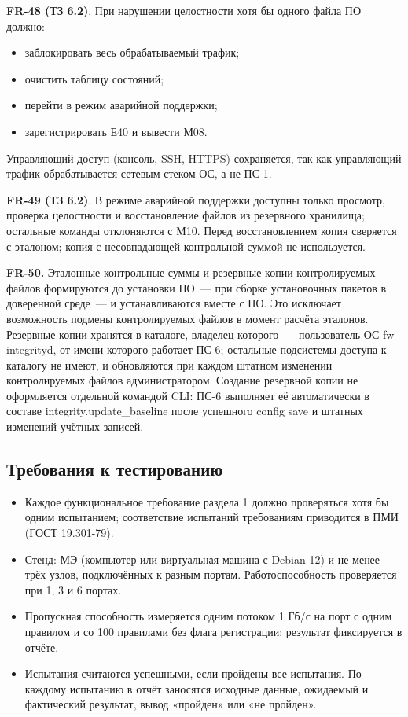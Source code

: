 \documentclass[13pt,a4paper,final]{article}
\begin{document}
	\textbf{FR-48 (ТЗ 6.2)}. При нарушении целостности хотя бы одного файла ПО должно:
	\begin{itemize}
		\item заблокировать весь обрабатываемый трафик;
		\item очистить таблицу состояний;
		\item перейти в режим аварийной поддержки;
		\item зарегистрировать Е40 и вывести М08.
	\end{itemize}
	Управляющий доступ (консоль, SSH, HTTPS) сохраняется, так как управляющий трафик обрабатывается сетевым стеком ОС, а не ПС-1.
	
	\textbf{FR-49 (ТЗ 6.2)}. В режиме аварийной поддержки доступны только просмотр, проверка целостности и восстановление файлов из резервного хранилища; остальные команды отклоняются с М10. Перед восстановлением копия сверяется с эталоном; копия с несовпадающей контрольной суммой не используется.
	
	\textbf{FR-50.} Эталонные контрольные суммы и резервные копии контролируемых файлов формируются до установки ПО~--- при сборке установочных пакетов в доверенной среде~--- и устанавливаются вместе с ПО. Это исключает возможность подмены контролируемых файлов в момент расчёта эталонов. Резервные копии хранятся в каталоге, {владелец которого~--- пользователь ОС fw-integrityd, от имени которого работает ПС-6; остальные подсистемы доступа к каталогу не имеют,} и обновляются при каждом штатном изменении контролируемых файлов администратором. {Создание резервной копии не оформляется отдельной командой CLI: ПС-6 выполняет её автоматически в составе {integrity.update\_baseline} после успешного 
		{config save} и штатных изменений учётных записей.}
	
	\subsection{Требования к тестированию}
	
	\begin{itemize}
		\item Каждое функциональное требование раздела 1 должно проверяться хотя бы одним испытанием; соответствие испытаний требованиям приводится в ПМИ (ГОСТ 19.301-79).
		\item Стенд: МЭ (компьютер или виртуальная машина с Debian 12) и не менее трёх узлов, подключённых к разным портам. Работоспособность проверяется при 1, 3 и 6 портах.
		\item Пропускная способность измеряется одним потоком 1 Гб/с на порт с одним правилом и со 100 правилами без флага регистрации; результат фиксируется в отчёте.
		\item Испытания считаются успешными, если пройдены все испытания. По каждому испытанию в отчёт заносятся исходные данные, ожидаемый и фактический результат, вывод «пройден» или «не пройден».
	\end{itemize}
	
\end{document}
